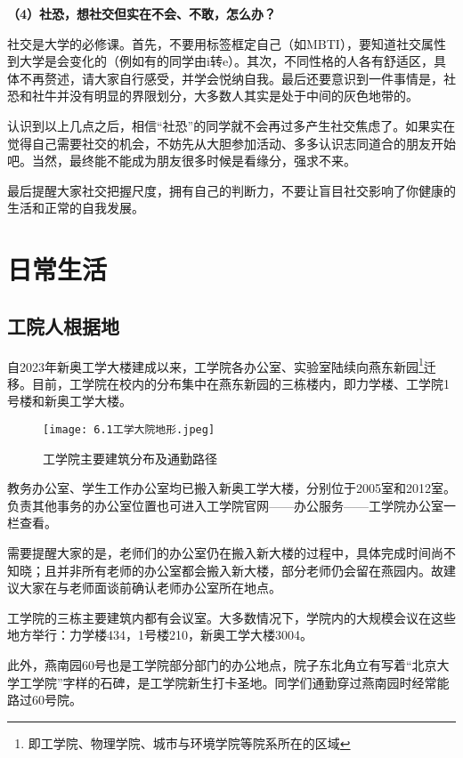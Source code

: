 \documentclass[11pt,oneside]{book}
\begin{document}
\textbf{（4）社恐，想社交但实在不会、不敢，怎么办？}

社交是大学的必修课。首先，不要用标签框定自己（如MBTI），要知道社交属性到大学是会变化的（例如有的同学由i转e）。其次，不同性格的人各有舒适区，具体不再赘述，请大家自行感受，并学会悦纳自我。最后还要意识到一件事情是，社恐和社牛并没有明显的界限划分，大多数人其实是处于中间的灰色地带的。

认识到以上几点之后，相信“社恐”的同学就不会再过多产生社交焦虑了。如果实在觉得自己需要社交的机会，不妨先从大胆参加活动、多多认识志同道合的朋友开始吧。当然，最终能不能成为朋友很多时候是看缘分，强求不来。

最后提醒大家社交把握尺度，拥有自己的判断力，不要让盲目社交影响了你健康的生活和正常的自我发展。




\chapter{日常生活}

\section{工院人根据地}

自2023年新奥工学大楼建成以来，工学院各办公室、实验室陆续向燕东新园\footnote{即工学院、物理学院、城市与环境学院等院系所在的区域}迁移。目前，工学院在校内的分布集中在燕东新园的三栋楼内，即力学楼、工学院1号楼和新奥工学大楼。

\begin{figure}[htbp]
    \centering
    \texttt{[image: 6.1工学大院地形.jpeg]}
    \renewcommand{\figurename}{图}
    \caption{工学院主要建筑分布及通勤路径}
    \label{fig:enter-label}
\end{figure}

教务办公室、学生工作办公室均已搬入新奥工学大楼，分别位于2005室和2012室。负责其他事务的办公室位置也可进入工学院官网——办公服务——工学院办公室一栏查看。

需要提醒大家的是，老师们的办公室仍在搬入新大楼的过程中，具体完成时间尚不知晓；且并非所有老师的办公室都会搬入新大楼，部分老师仍会留在燕园内。故建议大家在与老师面谈前确认老师办公室所在地点。

工学院的三栋主要建筑内都有会议室。大多数情况下，学院内的大规模会议在这些地方举行：力学楼434，1号楼210，新奥工学大楼3004。

此外，燕南园60号也是工学院部分部门的办公地点，院子东北角立有写着“北京大学工学院”字样的石碑，是工学院新生打卡圣地。同学们通勤穿过燕南园时经常能路过60号院。
\end{document}

